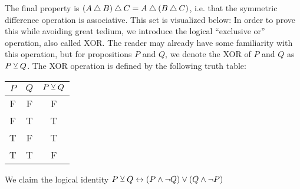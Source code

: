 {    The final property is $(A \bigtriangleup B) \bigtriangleup C = A \bigtriangleup (B \bigtriangleup C)$, i.e. that the symmetric difference operation is associative.
    This set is visualized below:
    In order to prove this while avoiding great tedium, we introduce the logical ``exclusive or'' operation, also called XOR.
    The reader may already have some familiarity with this operation, but for propositions $P$ and $Q$, we denote the XOR of $P$ and $Q$ as $P \veebar Q$.
    The XOR operation is defined by the following truth table:
    \begin{center}
        \begin{tabular}{cc|c}
            $P$ & $Q$ & $P \veebar Q$ \\
            \hline
            F   & F   & F           \\
            F   & T   & T           \\
            T   & F   & T           \\
            T   & T   & F
        \end{tabular}
    \end{center}
    \begin{lem}\label{lem:oper:xorid}
        We claim the logical identity $P \veebar Q \leftrightarrow (P \land \lnot Q) \lor (Q \land \lnot P)$
    \end{lem}
    \begin{lem}\label{lem:oper:xorassoc}

\end{lem}}
